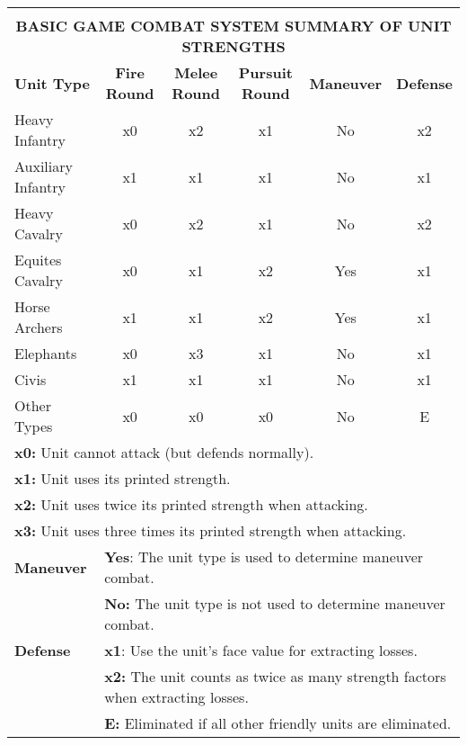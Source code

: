 \begin{tabular}{|lccccc|}
  \hline & & & & &\\[-2.0ex]
  \multicolumn{6}{|c|}{\textbf{BASIC GAME COMBAT SYSTEM SUMMARY OF UNIT STRENGTHS}}\\
  \textbf{Unit Type} & \textbf{Fire Round} & \textbf{Melee Round} & \textbf{Pursuit Round} & \textbf{Maneuver} & \textbf{Defense}\\
  Heavy Infantry & x0 & x2 & x1 & No & x2\\
  \rowcolor{BabyBlue}Auxiliary Infantry & x1 & x1 & x1 & No & x1\\
  Heavy Cavalry & x0 & x2 & x1 & No & x2\\
  \rowcolor{BabyBlue}Equites Cavalry & x0 & x1 & x2 & Yes & x1\\
  Horse Archers & x1 & x1 & x2 & Yes & x1\\
  \rowcolor{BabyBlue}Elephants & x0 & x3 & x1 & No & x1\\
  Civis & x1 & x1 & x1 & No & x1\\
  \rowcolor{BabyBlue}Other Types & x0 & x0 & x0 & No & E\\
  \multicolumn{6}{|l|}{\textbf{x0:} Unit cannot attack (but defends normally).}\\
  \multicolumn{6}{|l|}{\textbf{x1:} Unit uses its printed strength.}\\
  \multicolumn{6}{|l|}{\textbf{x2:} Unit uses twice its printed strength when attacking.}\\
  \multicolumn{6}{|l|}{\textbf{x3:} Unit uses three times its printed strength when attacking.}\\
  \textbf{Maneuver} & \multicolumn{5}{l|}{\textbf{Yes}: The unit type is used to determine maneuver combat.}\\
  & \multicolumn{5}{l|}{\textbf{No:} The unit type is not used to determine maneuver combat.}\\
  \textbf{Defense} & \multicolumn{5}{l|}{\textbf{x1}: Use the unit's face value for extracting losses.}\\
  & \multicolumn{5}{l|}{\textbf{x2:} The unit counts as twice as many strength factors when extracting losses.}\\
  & \multicolumn{5}{l|}{\textbf{E:} Eliminated if all other friendly units are eliminated.}\\
  \hline
\end{tabular}

